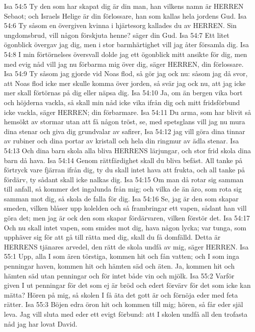 Isa 54:5  Ty den som har skapat dig är din man, han vilkens namn är HERREN Sebaot; och Israels Helige är din förlossare, han som kallas hela jordens Gud.
Isa 54:6  Ty såsom en övergiven kvinna i hjärtesorg kallades du av HERREN. Sin ungdomsbrud, vill någon förskjuta henne? säger din Gud.
Isa 54:7  Ett litet ögonblick övergav jag dig, men i stor barmhärtighet vill jag åter församla dig.
Isa 54:8  I min förtörnelses översvall dolde jag ett ögonblick mitt ansikte för dig, men med evig nåd vill jag nu förbarma mig över dig, säger HERREN, din förlossare.
Isa 54:9  Ty såsom jag gjorde vid Noas flod, så gör jag ock nu: såsom jag då svor, att Noas flod icke mer skulle komma över jorden, så svär jag ock nu, att jag icke mer skall förtörnas på dig eller näpsa dig.
Isa 54:10  Ja, om än bergen vika bort och höjderna vackla, så skall min nåd icke vika ifrån dig och mitt fridsförbund icke vackla, säger HERREN; din förbarmare.
Isa 54:11  Du arma, som har blivit så hemsökt av stormar utan att få någon tröst, se, med spetsglans vill jag nu mura dina stenar och giva dig grundvalar av safirer,
Isa 54:12  jag vill göra dina tinnar av rubiner och dina portar av kristall och hela din ringmur av ädla stenar.
Isa 54:13  Och dina barn skola alla bliva HERRENS lärjungar, och stor frid skola dina barn då hava.
Isa 54:14  Genom rättfärdighet skall du bliva befäst. All tanke på förtryck vare fjärran ifrån dig, ty du skall intet hava att frukta, och all tanke på fördärv, ty sådant skall icke nalkas dig.
Isa 54:15  Om man då rotar sig samman till anfall, så kommer det ingalunda från mig; och vilka de än äro, som rota sig samman mot dig, så skola de falla för dig.
Isa 54:16  Se, jag är den som skapar smeden, vilken blåser upp kolelden och så frambringar ett vapen, sådant han vill göra det; men jag är ock den som skapar fördärvaren, vilken förstör det.
Isa 54:17  Och nu skall intet vapen, som smides mot dig, hava någon lycka; var tunga, som upphäver sig för att gå till rätta med dig, skall du få domfälld. Detta är HERRENS tjänares arvedel, den rätt de skola undfå av mig, säger HERREN.
Isa 55:1  Upp, alla I som ären törstiga, kommen hit och fån vatten; och I som inga penningar haven, kommen hit och hämten säd och äten. Ja, kommen hit och hämten säd utan penningar och för intet både vin och mjölk.
Isa 55:2  Varför given I ut penningar för det som ej är bröd och edert förvärv för det som icke kan mätta? Hören på mig, så skolen I få äta det gott är och förnöja eder med feta rätter.
Isa 55:3  Böjen edra öron hit och kommen till mig; hören, så får eder själ leva. Jag vill sluta med eder ett evigt förbund: att I skolen undfå all den trofasta nåd jag har lovat David.
